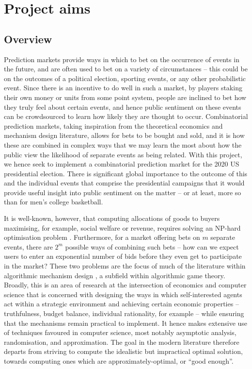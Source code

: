 \documentclass[10pt,a4paper]{article}
\theoremstyle{plain}
\theoremstyle{definition}
\begin{document}
\section{Project aims}
	\label{sec:aims}

	\subsection{Overview}

	Prediction markets provide ways in which to bet on the occurrence of events
	in the future, and are often used to bet on a variety of circumstances --
	this could be on the outcomes of a political election, sporting events, or
	any other probabilistic event. Since there is an incentive to do well in
	such a market, by players staking their own money or units from some point
	system, people are inclined to bet how they truly feel about certain
	events, and hence public sentiment on these events can be crowdsourced to
	learn how likely they are thought to occur. Combinatorial prediction
	markets, taking inspiration from the theoretical economics and mechanism
	design literature, allows for bets to be bought and sold, and it is how
	these are combined in complex ways that we may learn the most about how the
	public view the likelihood of separate events as being related. With this
	project, we hence seek to implement a combinatorial prediction market for
	the 2020 US presidential election. There is significant global importance
	to the outcome of this and the individual events that comprise the
	presidential campaigns that it would provide useful insight into public
	sentiment on the matter -- or at least, more so than for men's college
	basketball.

	It is well-known, however, that computing allocations of goods to buyers
	maximising, for example, social welfare or revenue, requires solving an
	NP-hard optimisation problem \cite{VCGNPhard}. Furthermore, for a market
	offering bets on $m$ separate events, there are $2^m$ possible ways of
	combining such bets -- how can we expect users to enter an exponential
	number of bids before they even get to participate in the market? These two
	problems are the focus of much of the literature within algorithmic
	mechanism design \cite{AMD}, a subfield within algorithmic game theory.
	Broadly, this is an area of research at the intersection of economics and
	computer science that is concerned with designing the ways in which
	self-interested agents act within a strategic environment and achieving
	certain economic properties -- truthfulness, budget balance, individual
	rationality, for example -- while ensuring that the mechanisms remain
	practical to implement. It hence makes extensive use of techniques favoured
	in computer science, most notably asymptotic analysis, randomisation, and
	approximation. The goal in the modern literature therefore departs from
	striving to compute the idealistic but impractical optimal solution,
	towards computing ones which are approximately-optimal, or ``good enough''.
\end{document}
